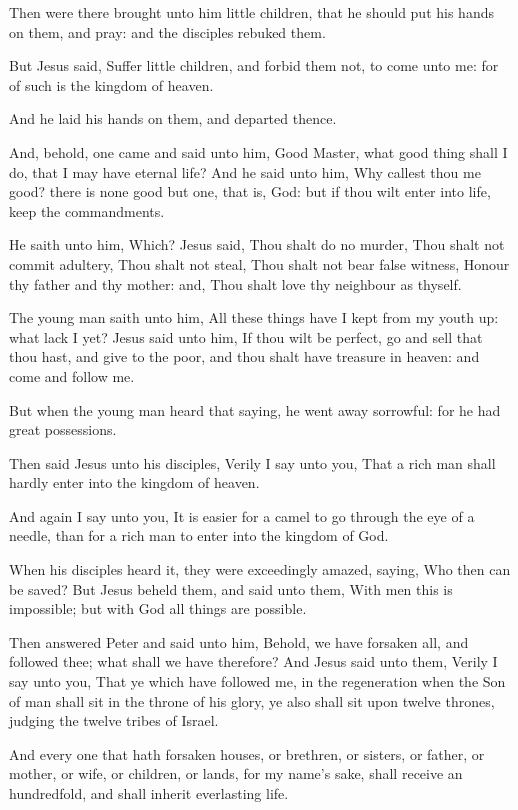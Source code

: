 \Verse Then were there brought unto him little children, that he should put his hands on them, and pray: and the disciples rebuked them.

\Verse But Jesus said, Suffer little children, and forbid them not, to come unto me: for of such is the kingdom of heaven.

\Verse And he laid his hands on them, and departed thence.

\Verse And, behold, one came and said unto him, Good Master, what good thing shall I do, that I may have eternal life?  \Verse And he said unto him, Why callest thou me good? there is none good but one, that is, God: but if thou wilt enter into life, keep the commandments.

\Verse He saith unto him, Which? Jesus said, Thou shalt do no murder, Thou shalt not commit adultery, Thou shalt not steal, Thou shalt not bear false witness, \Verse Honour thy father and thy mother: and, Thou shalt love thy neighbour as thyself.

\Verse The young man saith unto him, All these things have I kept from my youth up: what lack I yet?  \Verse Jesus said unto him, If thou wilt be perfect, go and sell that thou hast, and give to the poor, and thou shalt have treasure in heaven: and come and follow me.

\Verse But when the young man heard that saying, he went away sorrowful: for he had great possessions.

\Verse Then said Jesus unto his disciples, Verily I say unto you, That a rich man shall hardly enter into the kingdom of heaven.

\Verse And again I say unto you, It is easier for a camel to go through the eye of a needle, than for a rich man to enter into the kingdom of God.

\Verse When his disciples heard it, they were exceedingly amazed, saying, Who then can be saved?  \Verse But Jesus beheld them, and said unto them, With men this is impossible; but with God all things are possible.

\Verse Then answered Peter and said unto him, Behold, we have forsaken all, and followed thee; what shall we have therefore?  \Verse And Jesus said unto them, Verily I say unto you, That ye which have followed me, in the regeneration when the Son of man shall sit in the throne of his glory, ye also shall sit upon twelve thrones, judging the twelve tribes of Israel.

\Verse And every one that hath forsaken houses, or brethren, or sisters, or father, or mother, or wife, or children, or lands, for my name's sake, shall receive an hundredfold, and shall inherit everlasting life.

